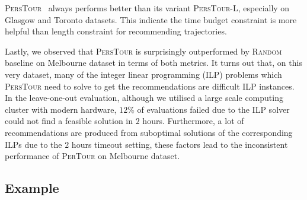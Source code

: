 \textsc{PersTour}~\cite{ijcai15} always performs better than its variant \textsc{PersTour-L},
especially on Glasgow and Toronto datasets.
This indicate the time budget constraint is more helpful than length constraint for recommending trajectories.

Lastly, we observed that \textsc{PersTour} is surprisingly outperformed by \textsc{Random} baseline
on Melbourne dataset in terms of both metrics.
It turns out that, on this very dataset, many of the integer linear programming (ILP) problems
which \textsc{PersTour} need to solve to get the recommendations are difficult ILP instances.
In the leave-one-out evaluation, although we utilised a large scale computing cluster with modern hardware,
$12\%$ of evaluations failed due to the ILP solver could not find a feasible solution in $2$ hours.
Furthermore, a lot of recommendations are produced from suboptimal solutions of the corresponding ILPs due to
the $2$ hours timeout setting, these factors lead to the inconsistent performance of \textsc{PerTour} on Melbourne dataset.


\subsection{Example}
\label{sec:example}
\secmoveup



